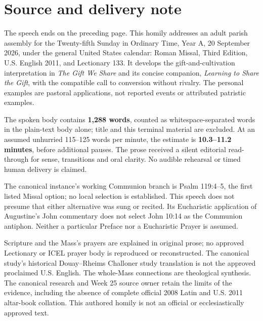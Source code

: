 \section*{Source and delivery note}
The speech ends on the preceding page. This homily addresses an adult parish assembly for the Twenty-fifth Sunday in Ordinary Time, Year A, 20 September 2026, under the general United States calendar: Roman Missal, Third Edition, U.S. English 2011, and Lectionary 133. It develops the gift-and-cultivation interpretation in \textit{The Gift We Share} and its concise companion, \textit{Learning to Share the Gift}, with the compatible call to conversion without rivalry. The personal examples are pastoral applications, not reported events or attributed patristic examples.

The spoken body contains \textbf{1,288 words}, counted as whitespace-separated words in the plain-text body alone; title and this terminal material are excluded. At an assumed unhurried 115--125 words per minute, the estimate is \textbf{10.3--11.2 minutes}, before additional pauses. The prose received a silent editorial read-through for sense, transitions and oral clarity. No audible rehearsal or timed human delivery is claimed.

The canonical instance's working Communion branch is Psalm 119:4--5, the first listed Missal option; no local selection is established. This speech does not presume that either alternative was sung or recited. Its Eucharistic application of Augustine's John commentary does not select John 10:14 as the Communion antiphon. Neither a particular Preface nor a Eucharistic Prayer is assumed.

Scripture and the Mass's prayers are explained in original prose; no approved Lectionary or ICEL prayer body is reproduced or reconstructed. The canonical study's historical Douay--Rheims Challoner study translation is not the approved proclaimed U.S. English. The whole-Mass connections are theological synthesis. The canonical research and Week 25 source owner retain the limits of the evidence, including the absence of complete official 2008 Latin and U.S. 2011 altar-book collation. This authored homily is not an official or ecclesiastically approved text.

